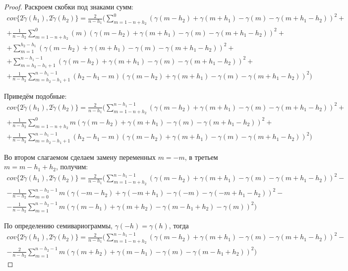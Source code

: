 \begin{proof}
Раскроем скобки под знаками сумм:
\begin{multline*}
	cov\{ 2 \tilde{\gamma}(h_1), 2 \tilde{\gamma}(h_2) \} = \frac{2}{n - h_1} (\sum_{m = 1 - n + h_2}^{0} (\gamma(m - h_2) + \gamma(m + h_1) - \gamma(m) - \gamma(m + h_1 - h_2))^2 + \\
	+ \frac{1}{n - h_2} \sum_{m = 1 - n + h_2}^{0} (m)(\gamma(m - h_2) + \gamma(m + h_1) - \gamma(m) - \gamma(m + h_1 - h_2))^2 + \\
	+ \sum_{m = 1}^{h_2 - h_1}(\gamma(m - h_2) + \gamma(m + h_1) - \gamma(m) - \gamma(m + h_1 - h_2))^2 + \\
	+ \sum_{m = h_2 - h_1 + 1}^{n - h_1 - 1}(\gamma(m - h_2) + \gamma(m + h_1) - \gamma(m) - \gamma(m + h_1 - h_2))^2 + \\
	+ \frac{1}{n - h_2} \sum_{m = h_2 - h_1 + 1}^{n - h_1 - 1} (h_2 - h_1 -m) (\gamma(m - h_2) + \gamma(m + h_1) - \gamma(m) - \gamma(m + h_1 - h_2))^2)
\end{multline*}

Приведём подобные:
\begin{multline*}
	cov\{ 2 \tilde{\gamma}(h_1), 2 \tilde{\gamma}(h_2) \} = \frac{2}{n - h_1} (\sum_{m = 1 - n + h_2}^{n - h_1 - 1} (\gamma(m - h_2) + \gamma(m + h_1) - \gamma(m) - \gamma(m + h_1 - h_2))^2 + \\
	+ \frac{1}{n - h_2} \sum_{m = 1 - n + h_2}^{0} m (\gamma(m - h_2) + \gamma(m + h_1) - \gamma(m) - \gamma(m + h_1 - h_2))^2 + \\
	+ \frac{1}{n - h_2} \sum_{m = h_2 - h_1 + 1}^{n - h_1 - 1} (h_2 - h_1 - m) (\gamma(m - h_2) + \gamma(m + h_1) - \gamma(m) - \gamma(m + h_1 - h_2))^2)
\end{multline*}

Во втором слагаемом сделаем замену переменных $ m = -m $, в третьем $ m = m - h_1 + h_2 $, получим:
\begin{multline*}
	cov\{ 2 \tilde{\gamma}(h_1), 2 \tilde{\gamma}(h_2) \} = \frac{2}{n - h_1} (\sum_{m = 1 - n + h_2}^{n - h_1 - 1} (\gamma(m - h_2) + \gamma(m + h_1) - \gamma(m) - \gamma(m + h_1 - h_2))^2 - \\
	- \frac{1}{n - h_2} \sum_{m = 0}^{n - h_2 - 1} m (\gamma(-m - h_2) + \gamma(-m + h_1) - \gamma(-m) - \gamma(-m + h_1 - h_2))^2 - \\
	- \frac{1}{n - h_2} \sum_{m = 1}^{n - h_2 - 1} m (\gamma(m - h_1) + \gamma(m + h_2) - \gamma(m - h_1 + h_2) - \gamma(m))^2)
\end{multline*}

По определению семивариограммы, $ \gamma(-h) = \gamma(h) $, тогда
\begin{multline*}
	cov\{ 2 \tilde{\gamma}(h_1), 2 \tilde{\gamma}(h_2) \} = \frac{2}{n - h_1} (\sum_{m = 1 - n + h_2}^{n - h_1 - 1} (\gamma(m - h_2) + \gamma(m + h_1) - \gamma(m) - \gamma(m + h_1 - h_2))^2 - \\
	- \frac{2}{n - h_2} \sum_{m = 1}^{n - h_2 - 1} m (\gamma(m + h_2) + \gamma(m - h_1) - \gamma(m) - \gamma(m - h_1 + h_2))^2)
\end{multline*}


\end{proof}
